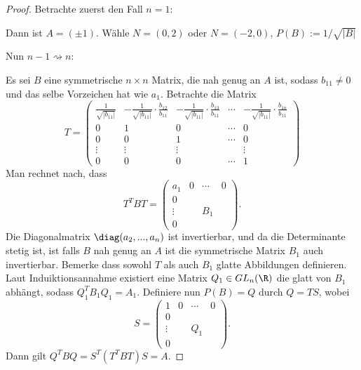 \begin{proof}
    Betrachte zuerst den Fall $n = 1$:

    Dann ist $A = (\pm 1)$. Wähle $N = (0, 2)$ oder $N = (-2, 0)$, $P(B) := 1/\sqrt{|B|}$

    Nun $n - 1 \rightsquigarrow n$:

    Es sei $B$ eine symmetrische $n \times n$ Matrix, die nah genug an $A$ ist, sodass
    $b_{11} \neq 0$ und das selbe Vorzeichen hat wie $a_1$. Betrachte die Matrix 
    \[ T = \begin{pmatrix}
        \frac{1}{\sqrt{|b_{11}|}} & 
            - \frac{1}{\sqrt{|b_{11}|}} \cdot \frac{b_{12}}{b_{11}} & 
            - \frac{1}{\sqrt{|b_{11}|}} \cdot \frac{b_{13}}{b_{11}} & \cdots & 
            - \frac{1}{\sqrt{|b_{11}|}} \cdot \frac{b_{1n}}{b_{11}} \\
        0 & 1 & 0 & \cdots & 0 \\
        0 & 0 & 1 & \cdots & 0 \\
        \vdots & \vdots & \vdots & & \vdots \\
        0 & 0 & 0 & \cdots & 1 
    \end{pmatrix} \]
    Man rechnet nach, dass 
    \[ T^T B T = \begin{pmatrix}
        a_1 & 0 & \cdots & 0 \\
        0 & & & \\
        \vdots & & B_1 & \\
        0 & & &
    \end{pmatrix}. \]
    Die Diagonalmatrix $\diag(a_2, ..., a_n)$ ist invertierbar, und da die 
    Determinante stetig ist, ist falls $B$ nah genug an $A$ ist die symmetrische Matrix 
    $B_1$ auch invertierbar. Bemerke dass sowohl $T$ als auch $B_1$ glatte Abbildungen
    definieren. Laut Induiktionsannahme existiert eine Matrix 
    $Q_1 \in GL_n(\R)$ die glatt von $B_1$ abhängt, sodass $Q_1^T B_1 Q_1 = A_1$.
    Definiere nun $P(B) = Q$ durch $Q = TS$, wobei
    \[ S = \begin{pmatrix}
        1 & 0 & \cdots & 0 \\
        0 & & & \\
        \vdots & & Q_1 & \\
        0 & & &
    \end{pmatrix}. \]
    Dann gilt $Q^TBQ = S^T (T^T B T) S = A$.
\end{proof}

